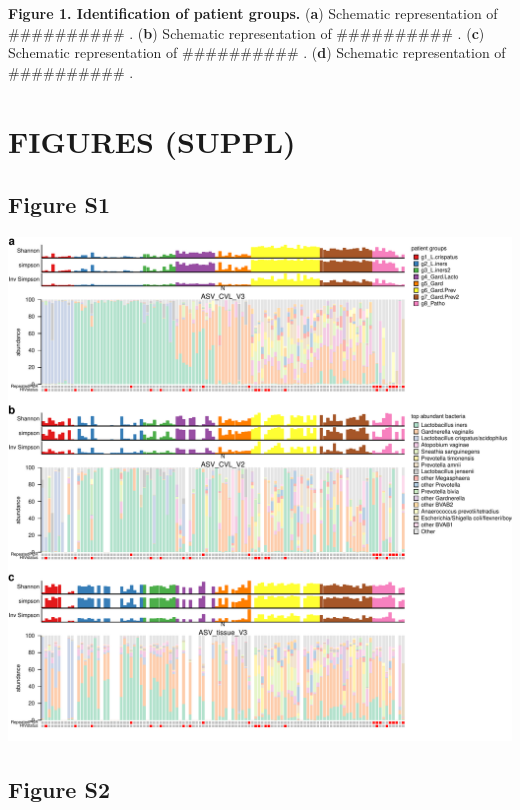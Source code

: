\documentclass[
]{article}
\begin{document}
\textbf{Figure 1. Identification of patient groups.}
(\textbf{a}) Schematic representation of \#\#\#\#\#\#\#\#\#\# .
(\textbf{b}) Schematic representation of \#\#\#\#\#\#\#\#\#\# .
(\textbf{c}) Schematic representation of \#\#\#\#\#\#\#\#\#\# .
(\textbf{d}) Schematic representation of \#\#\#\#\#\#\#\#\#\# .

\clearpage

\hypertarget{figures-suppl}{%
\section{FIGURES (SUPPL)}\label{figures-suppl}}

\hypertarget{figure-s1}{%
\subsection{Figure S1}\label{figure-s1}}

\includegraphics[width=1\linewidth]{manuscript_template_files/figure-latex/unnamed-chunk-9-1}

\clearpage

\hypertarget{figure-s2}{%
\subsection{Figure S2}\label{figure-s2}}
\end{document}
